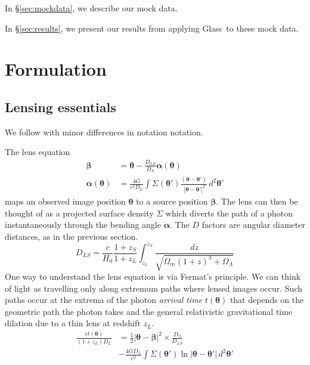 \documentclass[galley,usenatbib]{mn2e}
\newcommand{\Glass}{{\sc Glass}}
\newcommand{\secref}[1] {\S\ref{#1}}
\renewcommand{\vec}[1]{\ensuremath{\boldsymbol{#1}}}
\begin{document}
In \secref{sec:mockdata}, we describe our mock data.

In \secref{sec:results}, we present our results from applying \Glass\ to
these mock data.


\section{Formulation}\label{sec:theory}

\subsection{Lensing essentials}\label{sec:lensing_basic}

We follow \cite{1986ApJ...310..568B} with minor differences in notation
notation.

The lens equation
\begin{equation}
\begin{aligned}
\vec\beta &= \vec\theta - \frac{D_{LS}}{D_S}\vec\alpha(\vec\theta) \\
\vec\alpha(\vec\theta) &= \frac{4G}{c^2D_L} \int \Sigma(\vec\theta')
                          \frac{(\vec\theta - \vec\theta')}
                          {\ |\vec\theta - \vec\theta'|^2} \, d^2\vec\theta'
\end{aligned}
\label{eqn:lens_equation}
\end{equation}
maps an observed image position $\vec\theta$ to a source position
$\vec\beta$.  The lens can then be thought of as a projected surface
density $\Sigma$ which diverts the path of a photon instantaneously
through the bending angle $\vec\alpha$.  The $D$ factors are angular
diameter distances, as in the previous section.
\begin{equation}
D_{LS} = \frac c{H_0} \frac{1+z_S}{1+z_L} \int_{z_L}^{z_S}
                      \frac{dz}{\sqrt{\Omega_m(1+z)^3 + \Omega_\Lambda}}
\end{equation}
One way to understand the lens equation is via Fermat's principle. We
can think of light as travelling only along extremum paths where
lensed images occur. Such paths occur at
the extrema of the photon {\it arrival time\/} $t(\vec\theta)$
that depends on the geometric path the photon takes and the general
relativistic gravitational time dilation due to a thin lens at
redshift $z_L$.
\begin{equation}
\begin{aligned}
\frac{ct(\vec\theta)}{(1+z_L)D_{L}}
&= {\textstyle\frac12} |\vec\theta - \vec\beta|^2
   \times \frac{D_{S}}{D_{LS}} \\
&- \frac{4GD_L}{c^2}
   \int \Sigma(\vec\theta') \ln |\vec\theta-\vec\theta'| \, d^2\vec\theta'
\label{full arrival time}
\end{aligned}
\end{equation}
\end{document}
